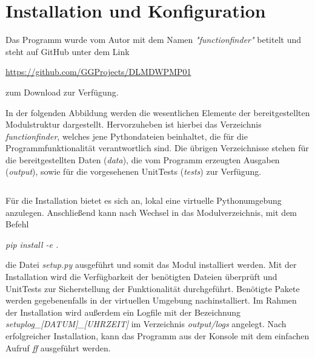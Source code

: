 \section{Installation und Konfiguration}

Das Programm wurde vom Autor mit dem Namen \emph{"functionfinder"} betitelt und steht auf GitHub unter dem Link \begin{center}\url{https://github.com/GGProjects/DLMDWPMP01}\end{center} zum Download zur Verfügung.

In der folgenden Abbildung werden die wesentlichen Elemente der bereitgestellten Modulstruktur dargestellt. Hervorzuheben ist hierbei das Verzeichnis \emph{functionfinder}, welches jene Pythondateien beinhaltet, die für die Programmfunktionalität verantwortlich sind.
Die übrigen Verzeichnisse stehen für die bereitgestellten Daten (\emph{data}), die vom Programm erzeugten Ausgaben (\emph{output}), sowie für die vorgesehenen UnitTests (\emph{tests}) zur Verfügung.

	
\begin{tabular}{c}  %

\end{tabular}


Für die Installation bietet es sich an, lokal eine virtuelle Pythonumgebung anzulegen. Anschließend kann nach Wechsel in das Modulverzeichnis, mit dem Befehl
\begin{center}\emph{pip install -e .}\end{center}
die Datei \emph{setup.py} ausgeführt und somit das Modul installiert werden.
Mit der Installation wird die Verfügbarkeit der benötigten Dateien überprüft und UnitTests zur Sicherstellung der Funktionalität durchgeführt. Benötigte Pakete werden gegebenenfalls in der virtuellen Umgebung nachinstalliert. Im Rahmen der Installation wird außerdem ein Logfile mit der Bezeichnung \emph{setuplog\_[DATUM]\_[UHRZEIT]} im Verzeichnis \emph{output/logs} angelegt.
Nach erfolgreicher Installation, kann das Programm aus der Konsole mit dem einfachen Aufruf \emph{ff} ausgeführt werden.

